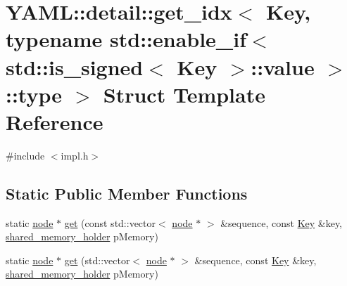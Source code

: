 \hypertarget{struct_y_a_m_l_1_1detail_1_1get__idx_3_01_key_00_01typename_01std_1_1enable__if_3_01std_1_1is__s88702b83581fef4d38e6abb882a529e6}{}\section{Y\+A\+ML\+::detail\+::get\+\_\+idx$<$ Key, typename std\+::enable\+\_\+if$<$ std\+::is\+\_\+signed$<$ Key $>$\+::value $>$\+::type $>$ Struct Template Reference}
\label{struct_y_a_m_l_1_1detail_1_1get__idx_3_01_key_00_01typename_01std_1_1enable__if_3_01std_1_1is__s88702b83581fef4d38e6abb882a529e6}


{\ttfamily \#include $<$impl.\+h$>$}

\subsection*{Static Public Member Functions}
\begin{DoxyCompactItemize}
\item 
static \mbox{\hyperlink{class_y_a_m_l_1_1detail_1_1node}{node}} $\ast$ \mbox{\hyperlink{struct_y_a_m_l_1_1detail_1_1get__idx_3_01_key_00_01typename_01std_1_1enable__if_3_01std_1_1is__s88702b83581fef4d38e6abb882a529e6_aba8aba05b7e679ef612803b659f8320b}{get}} (const std\+::vector$<$ \mbox{\hyperlink{class_y_a_m_l_1_1detail_1_1node}{node}} $\ast$ $>$ \&sequence, const \mbox{\hyperlink{namespace_y_a_m_l_a67c320aa50d3de7ecba1d0b8775dd684a1af533fc24b0311b8c4d5ac2870283aa}{Key}} \&key, \mbox{\hyperlink{namespace_y_a_m_l_1_1detail_a228c4b3b6ba1058b474d40afc218e21d}{shared\+\_\+memory\+\_\+holder}} p\+Memory)
\item 
static \mbox{\hyperlink{class_y_a_m_l_1_1detail_1_1node}{node}} $\ast$ \mbox{\hyperlink{struct_y_a_m_l_1_1detail_1_1get__idx_3_01_key_00_01typename_01std_1_1enable__if_3_01std_1_1is__s88702b83581fef4d38e6abb882a529e6_abdf891be70afa075240fc1d07d317d1b}{get}} (std\+::vector$<$ \mbox{\hyperlink{class_y_a_m_l_1_1detail_1_1node}{node}} $\ast$ $>$ \&sequence, const \mbox{\hyperlink{namespace_y_a_m_l_a67c320aa50d3de7ecba1d0b8775dd684a1af533fc24b0311b8c4d5ac2870283aa}{Key}} \&key, \mbox{\hyperlink{namespace_y_a_m_l_1_1detail_a228c4b3b6ba1058b474d40afc218e21d}{shared\+\_\+memory\+\_\+holder}} p\+Memory)
\end{DoxyCompactItemize}



